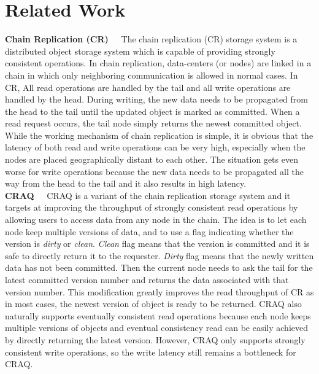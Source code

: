 \section{Related Work}

{\noindent \bf Chain Replication (CR)\ \ } The chain replication (CR) storage system is a distributed object storage system which is capable of providing strongly consistent operations. In chain replication, data-centers (or nodes) are linked in a chain in which only neighboring communication is allowed in normal cases. In CR, All read operations are handled by the tail and all write operations are handled by the head. During writing, the new data needs to be propagated from the head to the tail until the updated object is marked as committed. When a read request occurs, the tail node simply returns the newest committed object. While the working mechanism of chain replication is simple, it is obvious that the latency of both read and write operations can be very high, especially when the nodes are placed geographically distant to each other. The situation gets even worse for write operations because the new data needs to be propagated all the way from the head to the tail and it also results in high latency. \\

{\noindent \bf CRAQ\ \ } CRAQ\cite{terrace2009object} is a variant of the chain replication storage system and it targets at improving the throughput of strongly consistent read operations by allowing users to access data from any node in the chain. The idea is to let each node keep multiple versions of data, and to use a flag indicating whether the version is {\it dirty} or {\it clean}. {\it Clean} flag means that the version is committed and it is safe to directly return it to the requester. {\it Dirty} flag means that the newly written data has not been committed. Then the current node needs to ask the tail for the latest committed version number and returns the data associated with that version number. This modification greatly improves the read throughput of CR as in most cases, the newest version of object is ready to be returned. CRAQ also naturally supports eventually consistent read operations because each node keeps multiple versions of objects and eventual consistency read can be easily achieved by directly returning the latest version. However, CRAQ only supports strongly consistent write operations, so the write latency still remains a bottleneck for CRAQ. \\

